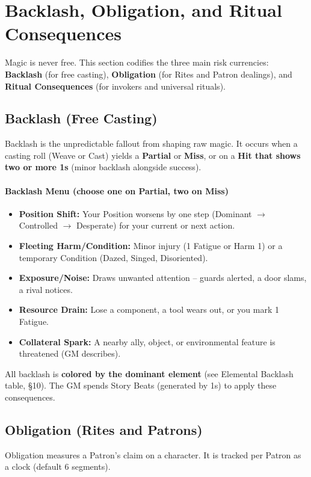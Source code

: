 \section{Backlash, Obligation, and Ritual Consequences}
\label{sec:backlash-obligation}

Magic is never free. This section codifies the three main risk currencies: \textbf{Backlash} (for free casting), \textbf{Obligation} (for Rites and Patron dealings), and \textbf{Ritual Consequences} (for invokers and universal rituals).

\subsection{Backlash (Free Casting)}
Backlash is the unpredictable fallout from shaping raw magic. It occurs when a casting roll (Weave or Cast) yields a \textbf{Partial} or \textbf{Miss}, or on a \textbf{Hit that shows two or more 1s} (minor backlash alongside success).

\paragraph{Backlash Menu (choose one on Partial, two on Miss)}
\begin{itemize}
  \item \textbf{Position Shift:} Your Position worsens by one step (Dominant $\to$ Controlled $\to$ Desperate) for your current or next action.
  \item \textbf{Fleeting Harm/Condition:} Minor injury (1 Fatigue or Harm 1) or a temporary Condition (Dazed, Singed, Disoriented).
  \item \textbf{Exposure/Noise:} Draws unwanted attention – guards alerted, a door slams, a rival notices.
  \item \textbf{Resource Drain:} Lose a component, a tool wears out, or you mark 1 Fatigue.
  \item \textbf{Collateral Spark:} A nearby ally, object, or environmental feature is threatened (GM describes).
\end{itemize}
All backlash is \textbf{colored by the dominant element} (see Elemental Backlash table, §10). The GM spends Story Beats (generated by 1s) to apply these consequences.

\subsection{Obligation (Rites and Patrons)}
Obligation measures a Patron's claim on a character. It is tracked per Patron as a clock (default 6 segments). 

